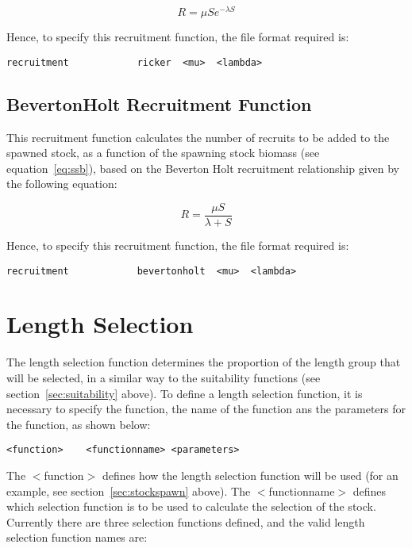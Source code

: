 \documentclass[10pt,twoside]{book}
\begin{document}
\begin{equation}\label{eq:rec3}
R = \mu S e ^{-\lambda S}
\end{equation}

Hence, to specify this recruitment function, the file format required is:

{\small\begin{verbatim}
recruitment            ricker  <mu>  <lambda>
\end{verbatim}}

\subsection{BevertonHolt Recruitment Function}
This recruitment function calculates the number of recruits to be added to the spawned stock, as a function of the spawning stock biomass (see equation~\ref{eq:ssb}), based on the Beverton Holt recruitment relationship given by the following equation:

\begin{equation}\label{eq:rec4}
R = \frac{\mu S}{\lambda + S}
\end{equation}

Hence, to specify this recruitment function, the file format required is:

{\small\begin{verbatim}
recruitment            bevertonholt  <mu>  <lambda>
\end{verbatim}}

\section{Length Selection}\label{sec:lselection}
The length selection function determines the proportion of the length group that will be selected, in a similar way to the suitability functions (see section~\ref{sec:suitability} above).  To define a length selection function, it is necessary to specify the function, the name of the function ans the parameters for the function, as shown below:

{\small\begin{verbatim}
<function>    <functionname> <parameters>
\end{verbatim}}

The $<$function$>$ defines how the length selection function will be used (for an example, see section~\ref{sec:stockspawn} above).  The $<$functionname$>$ defines which selection function is to be used to calculate the selection of the stock.  Currently there are three selection functions defined, and the valid length selection function names are:
\end{document}
